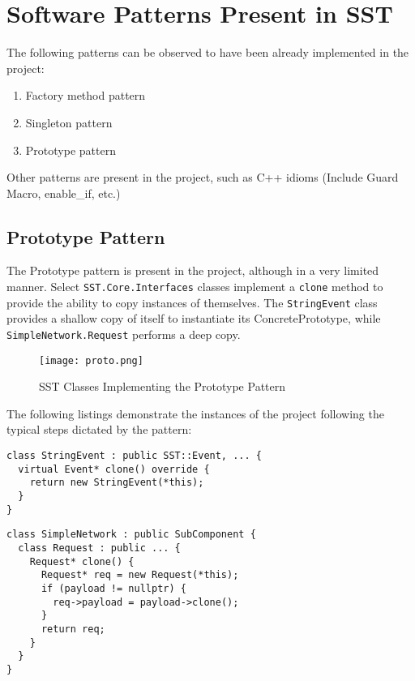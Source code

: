 \section{Software Patterns Present in SST}
The following patterns can be observed to have been already implemented in the project:
\begin{enumerate}
  \item Factory method pattern
  \item Singleton pattern
  \item Prototype pattern
\end{enumerate}
Other patterns are present in the project, such as C++ idioms (Include Guard Macro, enable\_if, etc.)





\subsection{Prototype Pattern}
The Prototype pattern is present in the project, although in a very limited manner. Select \texttt{SST.Core.Interfaces} classes implement a \texttt{clone} method to provide the ability to copy instances of themselves. The \texttt{StringEvent} class provides a shallow copy of itself to instantiate its ConcretePrototype, while \texttt{SimpleNetwork.Request} performs a deep copy.

\begin{figure}[h]
  \caption{SST Classes Implementing the Prototype Pattern}
  \centering
  \texttt{[image: proto.png]}
\end{figure}

The following listings demonstrate the instances of the project following the typical steps dictated by the pattern:

\begin{lstlisting}[style=customC++,label=prototype1,caption=StringEvent Implementing the Prototype Pattern \\ File: src/sst/core/interfaces/stringEvent.h]
class StringEvent : public SST::Event, ... {
  virtual Event* clone() override {
    return new StringEvent(*this);
  }
}
\end{lstlisting}

\begin{lstlisting}[style=customC++,label=prototype2,caption=SimpleNetwork::Request Implementing the Prototype Pattern \\ File: src/sst/core/interfaces/simpleNetwork.h]
class SimpleNetwork : public SubComponent {
  class Request : public ... {
    Request* clone() {
      Request* req = new Request(*this);
      if (payload != nullptr) {
        req->payload = payload->clone();
      }
      return req;
    }
  }
}
\end{lstlisting}

